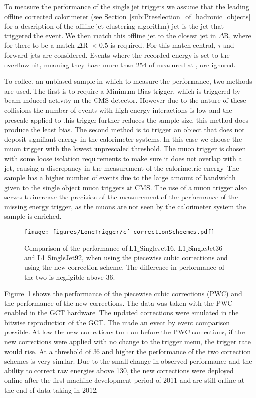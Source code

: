 To measure the performance of the \Lone single jet triggers we assume that the 
leading offline corrected \AK calorimeter (see 
Section~\ref{sub:Preselection_of_hadronic_objects} for a description of the 
offline jet clustering algorithm) jet is the jet that triggered the 
event. We then match this offline jet to the closest \Lone jet in $\Delta$R, 
where for there to be a match $\Delta$R $< 0.5$ is required. For this match 
central, $\tau$ and forward jets are considered. Events where the recorded 
\Lone energy is set to the overflow bit, meaning they have more than 
\unit{254}{\GeV} of \ET measured at \Lone, are ignored.

To collect an unbiased sample in which to measure the performance, two 
methods are used. The first is to require a Minimum Bias trigger, which is 
triggered by beam induced activity in the CMS detector.
However due to the nature of these collisions the number of events with high 
energy interactions is low and the prescale applied to this trigger further 
reduces the sample size, this method does produce the least bias.
The second method is to trigger an object that does not deposit signifiant 
energy in the calorimeter systems. In this case we choose the muon trigger with 
the lowest unprescaled \PT threshold. The muon trigger is chosen with some 
loose isolation requirements to make sure it does not overlap with a jet, 
causing a discrepancy in the measurement of the calorimetric energy. The sample 
has a higher number of events due to the large amount of bandwidth given to the 
single object muon triggers at CMS. The use of a muon trigger also serves to 
increase the precision of the measurement of the performance of the \Lone 
missing energy trigger, as the muons are not seen by the calorimeter system the 
\MET sample is enriched.

\begin{figure}[htbp]
  \centering
    \texttt{[image: figures/LoneTrigger/cf\_correctionScheemes.pdf]}
  \caption{Comparison of the performance of L1$\_$SingleJet16, 
  L1$\_$SingleJet36 and L1$\_$SingleJet92, when using the piecewise cubic 
  corrections and using the new correction scheme. The difference in 
  performance of the two is negligible above 36\GeV.}
  \label{fig:figures_LoneTrigger_cf_correctionScheemes}
\end{figure}

Figure~\ref{fig:figures_LoneTrigger_cf_correctionScheemes} shows the 
performance of the piecewise cubic corrections (PWC) and the performance of the 
new corrections. The data was taken with the PWC enabled in the GCT hardware. 
The updated corrections were emulated in the bitwise reproduction of the GCT. 
The made an event by event comparison possible. At low \ET the new corrections 
turn on before the PWC corrections, if the new corrections were applied with 
no change to the trigger menu, the \Lone trigger rate would rise. At a 
threshold of \unit{36}{\GeV} and higher the performance of the two correction 
schemes is very similar. Due to the small change in observed performance and 
the ability to correct raw energies above \unit{130}{\GeV}, the new corrections 
were deployed online after the first machine development period of 2011 and are 
still online at the end of data taking in 2012.

